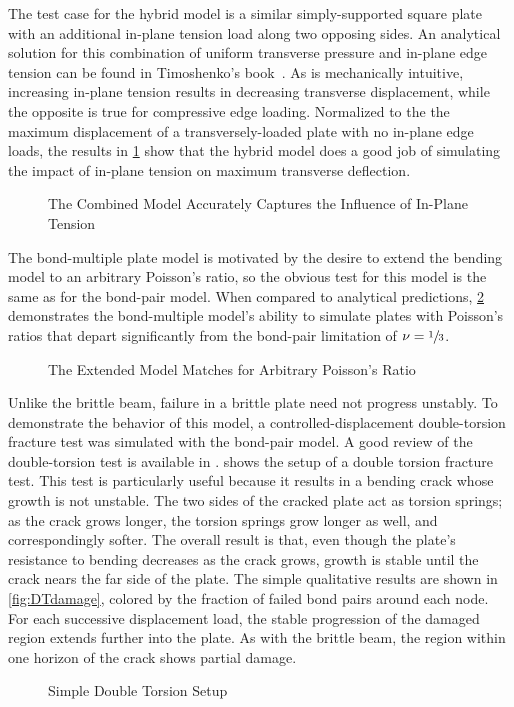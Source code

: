 The test case for the hybrid model is a similar simply-supported square plate with an additional in-plane tension load along two opposing sides.  An analytical solution for this combination of uniform transverse pressure and in-plane edge tension can be found in Timoshenko's book~\cite{timoshenko1959theory}.  As is mechanically intuitive, increasing in-plane tension results in decreasing transverse displacement, while the opposite is true for compressive edge loading.  Normalized to the the maximum displacement of a transversely-loaded plate with no in-plane edge loads, the results in \cref{fig:plateStiffening} show that the hybrid model does a good job of simulating the impact of in-plane tension on maximum transverse deflection.
%
\begin{figure}[tbhp]
  \centering
  \resizebox{0.6\linewidth}{!}{}
  \caption{The Combined Model Accurately Captures the Influence of In-Plane Tension}
  \label{fig:plateStiffening}
\end{figure}
%
The bond-multiple plate model is motivated by the desire to extend the bending model to an arbitrary Poisson's ratio, so the obvious test for this model is the same as for the bond-pair model. When compared to analytical predictions, \cref{fig:plate_poisson} demonstrates the bond-multiple model's ability to simulate plates with Poisson's ratios that depart significantly from the bond-pair limitation of $\nu = \sfrac{1}{3}$.
%
\begin{figure}[tbhp]
  \centering
  \resizebox{0.6\linewidth}{!}{}
  \caption{The Extended Model Matches for Arbitrary Poisson's Ratio}
  \label{fig:plate_poisson}
\end{figure}
%

Unlike the brittle beam, failure in a brittle plate need not progress unstably. 
To demonstrate the behavior of this model, a controlled-displacement double-torsion fracture test was simulated with the bond-pair model. 
A good review of the double-torsion test is available in \cite{shyam2006double}. 
 shows the setup of a double torsion fracture test. 
This test is particularly useful because it results in a bending crack whose growth is not unstable.
The two sides of the cracked plate act as torsion springs; as the crack grows longer, the torsion springs grow longer as well, and correspondingly softer.
The overall result is that, even though the plate's resistance to bending decreases as the crack grows, growth is stable until the crack nears the far side of the plate. 
The simple qualitative results are shown in \cref{fig:DTdamage}, colored by the fraction of failed bond pairs around each node. 
For each successive displacement load, the stable progression of the damaged region extends further into the plate. 
As with the brittle beam, the region within one horizon of the crack shows partial damage.
%
\begin{figure}[tbhp]
  \centering
  
  \caption{Simple Double Torsion Setup}
  \label{fig:DTsetup}
\end{figure}
%

